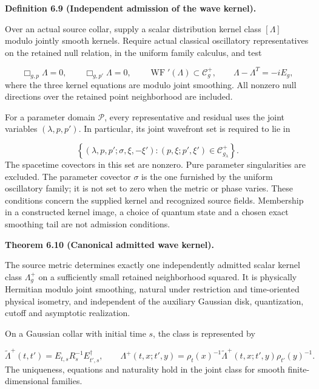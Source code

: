 \documentclass[
  english,
  11pt,
  reqno]{amsart}
\makeatletter
\newcommand{\pandocstatementheading}[1]{%
  \par\addpenalty{\@beginparpenalty}%
  \addvspace{.5\baselineskip plus .2\baselineskip minus .2\baselineskip}%
  {\normalfont\bfseries #1\par}%
  \nobreak\@afterindenttrue\@afterheading
}
\makeatother
\begin{document}
\pandocstatementheading{\leavevmode{}\label{def:online-independent-wave-kernel}Definition 6.9 (Independent admission of the wave kernel).}

Over an actual source collar, supply a scalar distribution kernel class
\([\Lambda]\) modulo jointly smooth kernels. Require actual classical
oscillatory representatives on the retained null relation, in the
uniform family calculus, and test

\label{eq:online-independent-wave-kernel-tests} \[
\Box_{g,p}\Lambda=0,\qquad
\Box_{g,p'}\Lambda=0,\qquad
\operatorname{WF}'(\Lambda)\subset\mathcal C_g^+,
\qquad
\Lambda-\Lambda^T=-iE_g,
\] where the three kernel equations are modulo joint smoothing. All
nonzero null directions over the retained point neighborhood are
included.

For a parameter domain \(\mathcal P\), every representative and residual
uses the joint variables \((\lambda,p,p')\). In particular, its joint
wavefront set is required to lie in

\label{eq:online-wave-joint-positive-relation} \[
\left\{
(\lambda,p,p';\sigma,\xi,-\xi'):
(p,\xi;p',\xi')\in\mathcal C_{g_\lambda}^+
\right\}.
\] The spacetime covectors in this set are nonzero. Pure parameter
singularities are excluded. The parameter covector \(\sigma\) is the one
furnished by the uniform oscillatory family; it is not set to zero when
the metric or phase varies. These conditions concern the supplied kernel
and recognized source fields. Membership in a constructed kernel image,
a choice of quantum state and a chosen exact smoothing tail are not
admission conditions.

\pandocstatementheading{\leavevmode{}\label{thm:online-canonical-wave-kernel}Theorem 6.10 (Canonical admitted wave kernel).}

The source metric determines exactly one independently admitted scalar
kernel class \(\Lambda_g^+\) on a sufficiently small retained
neighborhood squared. It is physically Hermitian modulo joint smoothing,
natural under restriction and time-oriented physical isometry, and
independent of the auxiliary Gaussian disk, quantization, cutoff and
asymptotic realization.

On a Gaussian collar with initial time \(s\), the class is represented
by

\label{eq:online-wave-kernel-factorization} \[
\widetilde\Lambda^+(t,t')
=E_{t,s}R_s^{-1}E_{t',s}^\dagger,
\qquad
\Lambda^+(t,x;t',y)
=\rho_t(x)^{-1}\widetilde\Lambda^+(t,x;t',y)\rho_{t'}(y)^{-1}.
\] The uniqueness, equations and naturality hold in the joint class for
smooth finite-dimensional families.
\end{document}
